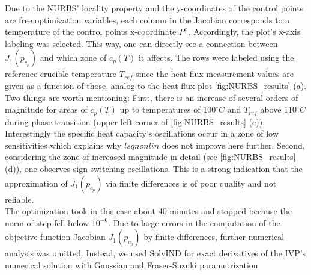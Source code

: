 \documentclass{scrartcl}[12pt, halfparskip]
\numberwithin{equation}{section}
\numberwithin{figure}{section}
\numberwithin{table}{section}
\begin{document}
Due to the NURBS' locality property and the y-coordinates of the control points are free optimization variables, each column in the Jacobian corresponds to a temperature of the control points x-coordinate $P^x$. Accordingly, the plot's x-axis labeling was selected.
This way, one can directly see a connection between $J_1(p_{c_p})$ and which zone of $c_p(T)$ it affects. 
The rows were labeled using the reference crucible temperature $T_{ref}$ since the heat flux measurement values are given as a function of those, analog to the heat flux plot \cref{fig:NURBS_results} (a).
Two things are worth mentioning: 
First, there is an increase of several orders of magnitude for areas of $c_p(T)$ up to temperatures of $100^\circ C$ and $T_{ref}$ above $110^\circ C$ during phase transition (upper left corner of \cref{fig:NURBS_results} (c)). Interestingly the specific heat capacity's oscillations occur in a zone of low sensitivities which explains why $lsqnonlin$ does not improve here further. 
Second, considering the zone of increased magnitude in detail (see \cref{fig:NURBS_results} (d)), one observes sign-switching oscillations. This is a strong indication that the approximation of $J_1(p_{c_p})$ via finite differences is of poor quality and not reliable. \\
The optimization took in this case about 40 minutes and stopped because the norm of step fell below $10^{-6}$.
Due to large errors in the computation of the objective function Jacobian $J_1(p_{c_p})$ by finite differences, further numerical analysis was omitted. Instead, we used SolvIND for exact derivatives of the IVP's numerical solution with Gaussian and Fraser-Suzuki parametrization.
\end{document}
